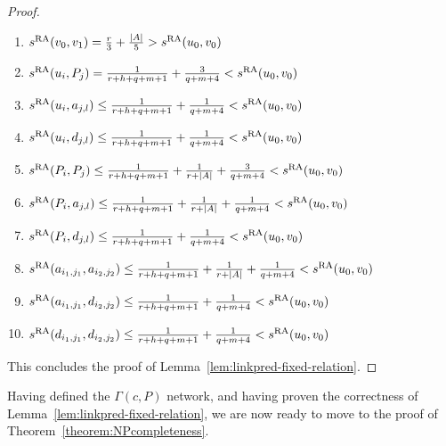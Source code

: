 \documentclass[twocolumn]{article}
\newcommand{\sRA}{s^{\text{\normalfont RA}}}
\begin{document}
\begin{proof}
\begin{enumerate}[label=(\roman*),leftmargin=*]\itemsep0.4em
\item $\sRA(v_0,v_1)=\frac{r}{3}+\frac{|A|}{5} > \sRA(u_0,v_0)$
\item $\sRA(u_i,P_j) = \frac{1}{r+h+q+m+1} + \frac{3}{q+m+4} < \sRA(u_0,v_0)$
\item $\sRA(u_i,a_{j,l}) \leq \frac{1}{r+h+q+m+1} + \frac{1}{q+m+4} < \sRA(u_0,v_0)$
\item $\sRA(u_i,d_{j,l}) \leq \frac{1}{r+h+q+m+1} + \frac{1}{q+m+4} < \sRA(u_0,v_0)$
\item $\sRA(P_i,P_j) \leq \frac{1}{r+h+q+m+1} + \frac{1}{r+|A|} + \frac{3}{q+m+4} < \sRA(u_0,v_0)$
\item $\sRA(P_i,a_{j,l}) \leq \frac{1}{r+h+q+m+1} + \frac{1}{r+|A|} + \frac{1}{q+m+4} < \sRA(u_0,v_0)$
\item $\sRA(P_i,d_{j,l}) \leq \frac{1}{r+h+q+m+1} + \frac{1}{q+m+4} < \sRA(u_0,v_0)$
\item $\sRA(a_{i_1,j_1},a_{i_2,j_2}) \leq \frac{1}{r+h+q+m+1} + \frac{1}{r+|A|} + \frac{1}{q+m+4} < \sRA(u_0,v_0)$
\item $\sRA(a_{i_1,j_1},d_{i_2,j_2}) \leq \frac{1}{r+h+q+m+1} + \frac{1}{q+m+4} < \sRA(u_0,v_0)$
\item $\sRA(d_{i_1,j_1},d_{i_2,j_2}) \leq \frac{1}{r+h+q+m+1} + \frac{1}{q+m+4} < \sRA(u_0,v_0)$\hspace*{\fill}
\end{enumerate}

\noindent This concludes the proof of Lemma~\ref{lem:linkpred-fixed-relation}.
\end{proof}

Having defined the $\Gamma(c,P)$ network, and having proven the correctness of Lemma~\ref{lem:linkpred-fixed-relation}, we are now ready to move to the proof of Theorem~\ref{theorem:NPcompleteness}.
\end{document}
